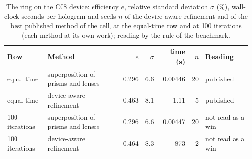 \begin{table}[t]\centering\footnotesize
\caption{The ring on the C08 device: efficiency $e$, relative standard deviation $\sigma$ (\%), wall-clock seconds per hologram and seeds $n$ of the device-aware refinement and of the best published method of the cell, at the equal-time row and at 100 iterations (each method at its own work); reading by the rule of the benchmark.}\label{tab:ring}
\begin{tabular}{@{}l l r r r r l@{}}\toprule Row & Method & $e$ & $\sigma$ & time (s) & $n$ & Reading\\\midrule
equal time & superposition of prisms and lenses & 0.296 & 6.6 & 0.00446 & 20 & published\\
equal time & device-aware refinement & 0.463 & 8.1 & 1.11 & 5 & published\\
100 iterations & superposition of prisms and lenses & 0.296 & 6.6 & 0.00447 & 20 & not read as a win\\
100 iterations & device-aware refinement & 0.464 & 8.3 & 873 & 2 & not read as a win\\
\bottomrule\end{tabular}\end{table}
